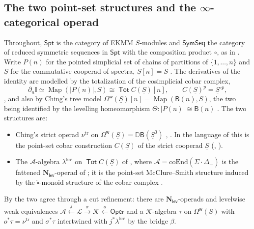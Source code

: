 \documentclass[11pt]{amsart}
\theoremstyle{definition}
\theoremstyle{remark}
\newcommand{\Spt}{\mathsf{Spt}}
\newcommand{\Tot}{\operatorname{\mathsf{Tot}}}
\newcommand{\Map}{\operatorname{Map}}
\newcommand{\SymSeq}{\mathsf{SymSeq}}
\newcommand{\Oper}{\mathsf{Oper}}
\newcommand{\Id}{\mathbb{I}}
\newcommand{\Nl}{\mathbf{N}_{\mathsf{lev}}}
\newcommand{\uS}{\underline{S}}
\newcommand{\uSz}{\underline{S}^{0}}
\newcommand{\BC}{\mathsf{B}}
\newcommand{\Omw}{\Omega^{\mathsf{w}}}
\newcommand{\Kop}{\mathcal{K}}
\newcommand{\Lop}{\mathcal{L}}
\newcommand{\Aop}{\mathcal{A}}
\newcommand{\dual}{\mathbb{D}}
\newcommand{\Lev}{\mathrm{lev}}
\newcommand{\tr}{\mathrm{tr}}
\begin{document}
\subsection{The two point-set structures and the $\infty$-categorical operad}
Throughout, $\Spt$ is the category of EKMM $S$-modules and $\SymSeq$ the category of reduced symmetric sequences in $\Spt$ with the composition product $\circ$, as in \cite[\S 3.1]{Cl2}. Write $P(n)$ for the pointed simplicial set of chains of partitions of $\{1,\dots,n\}$ \cite[Definition 2.4]{Cl2} and $\uS$ for the commutative cooperad of spectra, $\uS[n]=S$ \cite[\S 3.3]{Cl2}. The derivatives of the identity are modelled by the totalization of the cosimplicial cobar complex,
\[ \partial_n\Id \simeq \Map(|P(n)|, S) \cong \Tot C(\uS)[n], \qquad C(\uS)^p = \uS^{\circ p}, \]
\cite[Propositions A.35, A.37]{Cl2}, and also by Ching's tree model $\Omw(\uS)[n]=\Map(\BC(n),S)$, the two being identified by the levelling homeomorphism $\Theta\colon |P(n)|\cong \BC(n)$ \cite[Theorem A.24]{Cl2}. The two structures are:
\begin{itemize}[leftmargin=2em]
\item[(Ch)] Ching's strict operad $\nu^{\tr}$ on $\Omw(\uS)=\dual\BC(\uSz)$ \cite{Ch05}, \cite[Theorem A.34]{Cl2}. In the language of \cite{Ch12} this is the point-set cobar construction $C(\uS)$ of the strict cooperad $\uS$ (\cite[Definition 2.4, Example 5.1]{Ch12}, \cite[Proposition 6.4]{Ch05}).
\item[(box)] The $\Aop$-algebra $\lambda^{\Lev}$ on $\Tot C(\uS)$ of \cite[Theorem 1.1]{Cl2}, where $\Aop=\mathrm{coEnd}(\Sigma\cdot\Delta_+)$ is the fattened $\Nl$-operad of \cite[Definition 7.7]{Cl1}; it is the point-set McClure--Smith structure induced by the $\mathring\square$-monoid structure of the cobar complex \cite[Proposition 4.6]{Cl2}.
\end{itemize}
By \cite[Theorem 1.3 $=$ Theorem A.73]{Cl2} the two agree through a cut refinement: there are $\Nl$-operads and levelwise weak equivalences $\Aop\xleftarrow{\;j\;}\Lop\xrightarrow{\;\sigma\;}\Kop\xleftarrow{\;o\;}\Oper$ and a $\Kop$-algebra $\tau$ on $\Omw(\uS)$ with $o^*\tau=\nu^{\tr}$ and $\sigma^*\tau$ intertwined with $j^*\lambda^{\Lev}$ by the bridge $\beta$.
\end{document}
